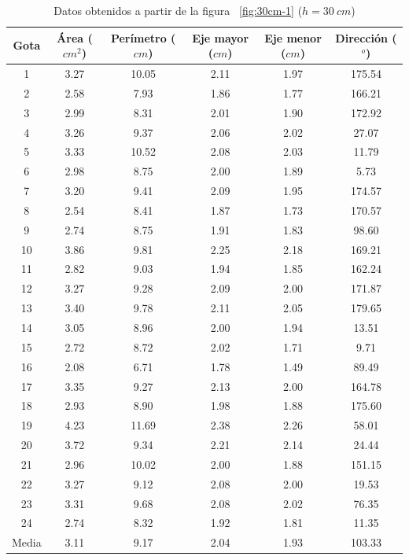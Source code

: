 \begin{table}[H] \centering \caption{Datos obtenidos a partir de la figura
    ~\ref{fig:30cm-1} ($h = 30\ cm$)} \label{tab:30cm} \begin{tabular}{cccccc}
        \toprule Gota & Área ($cm^2$) & Perímetro ($cm$) & Eje mayor ($cm$) &
        Eje menor ($cm$) & Dirección ($^o$) \\ \midrule 1     & 3.27 & 10.05 &
        2.11 & 1.97 & 175.54 \\ 2     & 2.58 & 7.93  & 1.86 & 1.77 & 166.21 \\
        3     & 2.99 & 8.31  & 2.01 & 1.90 & 172.92 \\ 4     & 3.26 & 9.37  &
        2.06 & 2.02 & 27.07  \\ 5     & 3.33 & 10.52 & 2.08 & 2.03 & 11.79  \\
        6     & 2.98 & 8.75  & 2.00 & 1.89 & 5.73   \\ 7     & 3.20 & 9.41  &
        2.09 & 1.95 & 174.57 \\ 8     & 2.54 & 8.41  & 1.87 & 1.73 & 170.57 \\
        9     & 2.74 & 8.75  & 1.91 & 1.83 & 98.60  \\ 10    & 3.86 & 9.81  &
        2.25 & 2.18 & 169.21 \\ 11    & 2.82 & 9.03  & 1.94 & 1.85 & 162.24 \\
        12    & 3.27 & 9.28  & 2.09 & 2.00 & 171.87 \\ 13    & 3.40 & 9.78  &
        2.11 & 2.05 & 179.65 \\ 14    & 3.05 & 8.96  & 2.00 & 1.94 & 13.51  \\
        15    & 2.72 & 8.72  & 2.02 & 1.71 & 9.71   \\ 16    & 2.08 & 6.71  &
        1.78 & 1.49 & 89.49  \\ 17    & 3.35 & 9.27  & 2.13 & 2.00 & 164.78 \\
        18    & 2.93 & 8.90  & 1.98 & 1.88 & 175.60 \\ 19    & 4.23 & 11.69 &
        2.38 & 2.26 & 58.01  \\ 20    & 3.72 & 9.34  & 2.21 & 2.14 & 24.44  \\
        21    & 2.96 & 10.02 & 2.00 & 1.88 & 151.15 \\ 22    & 3.27 & 9.12  &
        2.08 & 2.00 & 19.53  \\ 23    & 3.31 & 9.68  & 2.08 & 2.02 & 76.35  \\
    24    & 2.74 & 8.32  & 1.92 & 1.81 & 11.35  \\ \midrule Media & 3.11 & 9.17
          & 2.04 & 1.93 & 103.33 \\ \bottomrule \end{tabular} \end{table}

